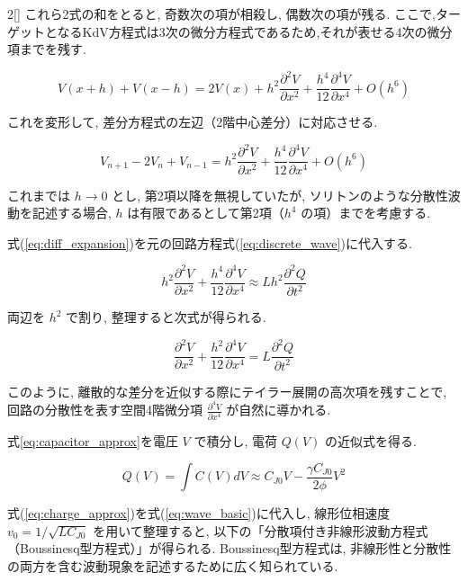\documentclass[a4paper,10pt]{article}
\begin{document}
\begin{multicols}{2}[\raggedcolumns]
これら2式の和をとると, 奇数次の項が相殺し, 偶数次の項が残る.
ここで,ターゲットとなるKdV方程式は3次の微分方程式であるため,それが表せる4次の微分項までを残す.

\begin{equation}
    V(x + h) + V(x - h) = 2V(x) + h^2 \frac{\partial^2 V}{\partial x^2} + \frac{h^4}{12} \frac{\partial^4 V}{\partial x^4} + O(h^6)
\end{equation}

これを変形して, 差分方程式の左辺（2階中心差分）に対応させる.

\begin{equation}
    V_{n+1} - 2V_n + V_{n-1} = h^2 \frac{\partial^2 V}{\partial x^2} + \frac{h^4}{12} \frac{\partial^4 V}{\partial x^4} + O(h^6) \label{eq:diff_expansion}
\end{equation}

これまでは $h \to 0$ とし, 第2項以降を無視していたが, ソリトンのような分散性波動を記述する場合, $h$ は有限であるとして第2項（$h^4$ の項）までを考慮する.

式(\ref{eq:diff_expansion})を元の回路方程式(\ref{eq:discrete_wave})に代入する.

\begin{equation}
    h^2 \frac{\partial^2 V}{\partial x^2} + \frac{h^4}{12} \frac{\partial^4 V}{\partial x^4} \approx L h^2 \frac{\partial^2 Q}{\partial t^2}
\end{equation}

両辺を $h^2$ で割り, 整理すると次式が得られる.

\begin{equation}
    \frac{\partial^2 V}{\partial x^2} + \frac{h^2}{12} \frac{\partial^4 V}{\partial x^4} = L \frac{\partial^2 Q}{\partial t^2} \label{eq:wave_basic}
\end{equation}

このように, 離散的な差分を近似する際にテイラー展開の高次項を残すことで, 回路の分散性を表す空間4階微分項 $\frac{\partial^4 V}{\partial x^4}$ が自然に導かれる.

式\ref{eq:capacitor_approx}を電圧 $V$ で積分し, 電荷 $Q(V)$ の近似式を得る.

\begin{equation}
    Q(V) = \int C(V) dV \approx C_{J0} V - \frac{\gamma C_{J0}}{2\phi} V^2 \label{eq:charge_approx}
\end{equation}

式(\ref{eq:charge_approx})を式(\ref{eq:wave_basic})に代入し, 線形位相速度 $v_0 = 1/\sqrt{LC_{J0}}$ を用いて整理すると, 以下の「分散項付き非線形波動方程式（Boussinesq型方程式）」が得られる.
Boussinesq型方程式は, 非線形性と分散性の両方を含む波動現象を記述するために広く知られている.


\end{multicols}
\end{document}
